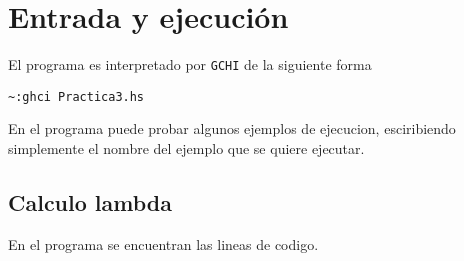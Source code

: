 \documentclass{article}
\begin{document}
\section{Entrada y ejecución}

El programa es interpretado por \texttt{GCHI} de la siguiente forma
\begin{lstlisting}[]
  ~:ghci Practica3.hs
\end{lstlisting}

En el programa puede probar algunos ejemplos de ejecucion, esciribiendo
simplemente  el nombre del ejemplo que se quiere ejecutar.\\

\subsection{Calculo lambda}
En el programa se encuentran las lineas de codigo.
\end{document}
